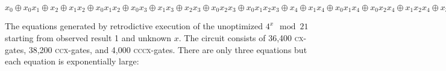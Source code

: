 \documentclass{article}
\newcommand{\cx}{\textsc{cx}}
\newcommand{\ccx}{\textsc{ccx}}
\newcommand{\cccx}{\textsc{cccx}}
\begin{document}
\begin{refsection}
\bigskip

$x_0 \oplus x_0x_1 \oplus x_2 \oplus x_1x_2 \oplus x_0x_1x_2 \oplus
x_0x_3 \oplus x_1x_3 \oplus x_2x_3 \oplus x_0x_2x_3 \oplus
x_0x_1x_2x_3 \oplus x_4 \oplus x_1x_4 \oplus x_0x_1x_4 \oplus
x_0x_2x_4 \oplus x_1x_2x_4 \oplus x_3x_4 \oplus x_0x_3x_4 \oplus
x_0x_1x_3x_4 \oplus x_2x_3x_4 \oplus x_1x_2x_3x_4 \oplus
x_0x_1x_2x_3x_4 \oplus x_0x_5 \oplus x_1x_5 \oplus x_2x_5 \oplus
x_0x_2x_5 \oplus x_0x_1x_2x_5 \oplus x_3x_5 \oplus x_1x_3x_5 \oplus
x_0x_1x_3x_5 \oplus x_0x_2x_3x_5 \oplus x_1x_2x_3x_5 \oplus x_4x_5
\oplus x_0x_4x_5 \oplus x_0x_1x_4x_5 \oplus x_2x_4x_5 \oplus
x_1x_2x_4x_5 \oplus x_0x_1x_2x_4x_5 \oplus x_0x_3x_4x_5 \oplus
x_1x_3x_4x_5 \oplus x_2x_3x_4x_5 \oplus x_0x_2x_3x_4x_5 \oplus
x_0x_1x_2x_3x_4x_5 = 0$

\bigskip

The equations generated by retrodictive execution of the unoptimized
$4^x \mod{21}$ starting from observed result 1 and unknown $x$. The
circuit consists of 36,400 \cx-gates, 38,200 \ccx-gates, and 4,000
\cccx-gates. There are only three equations but each equation is
exponentially large:

\bigskip


\end{refsection}
\end{document}
